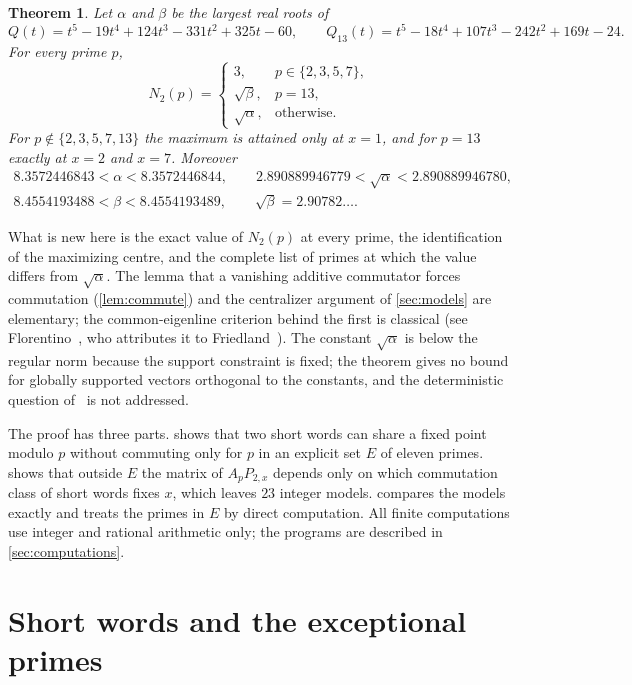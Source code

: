\documentclass[11pt,a4paper]{article}
\numberwithin{equation}{section}
\newtheorem{theorem}{Theorem}[section]
\theoremstyle{remark}
\begin{document}
\begin{theorem}\label{thm:main}
Let $\alpha$ and $\beta$ be the largest real roots of
\[
Q(t)=t^5-19t^4+124t^3-331t^2+325t-60,\qquad Q_{13}(t)=t^5-18t^4+107t^3-242t^2+169t-24 .
\]
For every prime $p$,
\[
N_2(p)=\begin{cases}3,& p\in\{2,3,5,7\},\\ \sqrt\beta,& p=13,\\ \sqrt\alpha,& \text{otherwise.}\end{cases}
\]
For $p\notin\{2,3,5,7,13\}$ the maximum is attained only at $x=1$, and for $p=13$ exactly at $x=2$ and $x=7$. Moreover
\begin{gather*}
8.3572446843<\alpha<8.3572446844,\qquad 2.890889946779<\sqrt\alpha<2.890889946780,\\
8.4554193488<\beta<8.4554193489,\qquad \sqrt\beta=2.90782\ldots .
\end{gather*}
\end{theorem}

What is new here is the exact value of $N_2(p)$ at every prime, the identification of the maximizing centre, and the complete list of primes at which the value differs from $\sqrt\alpha$. The lemma that a vanishing additive commutator forces commutation (\cref{lem:commute}) and the centralizer argument of \cref{sec:models} are elementary; the common-eigenline criterion behind the first is classical (see Florentino~\cite[Proposition~2.13]{Florentino}, who attributes it to Friedland~\cite{Friedland}). The constant $\sqrt\alpha$ is below the regular norm because the support constraint is fixed; the theorem gives no bound for globally supported vectors orthogonal to the constants, and the deterministic question of~\cite{vanHandel} is not addressed.

The proof has three parts.  shows that two short words can share a fixed point modulo $p$ without commuting only for $p$ in an explicit set $E$ of eleven primes.  shows that outside $E$ the matrix of $A_pP_{2,x}$ depends only on which commutation class of short words fixes $x$, which leaves $23$ integer models.  compares the models exactly and treats the primes in $E$ by direct computation. All finite computations use integer and rational arithmetic only; the programs are described in \cref{sec:computations}.

\section{Short words and the exceptional primes}\label{sec:short}
\end{document}
